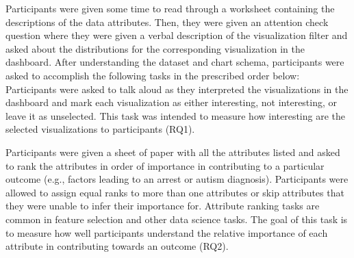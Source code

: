 \par Participants were given some time to read through a worksheet containing the descriptions of the data attributes. Then, they were given an attention check question where they were given a verbal description of the visualization filter and asked about the distributions for the corresponding visualization in the dashboard. After understanding the dataset and chart schema, participants were asked to accomplish the following tasks in the prescribed order below:
 Participants were asked to talk aloud as they interpreted the visualizations in the dashboard and mark each visualization as either interesting, not interesting, or leave it as unselected. This task was intended to measure how interesting are the selected visualizations to participants (RQ1).%

 Participants were given a sheet of paper with all the attributes listed and asked to rank the attributes in order of importance in contributing to a particular outcome (e.g., factors leading to an arrest or autism diagnosis). Participants were allowed to assign equal ranks to more than one attributes or skip attributes that they were unable to infer their importance for. Attribute ranking tasks are common in feature selection and other data science tasks. The goal of this task is to measure how well participants understand the relative importance of each attribute in contributing towards an outcome (RQ2).

